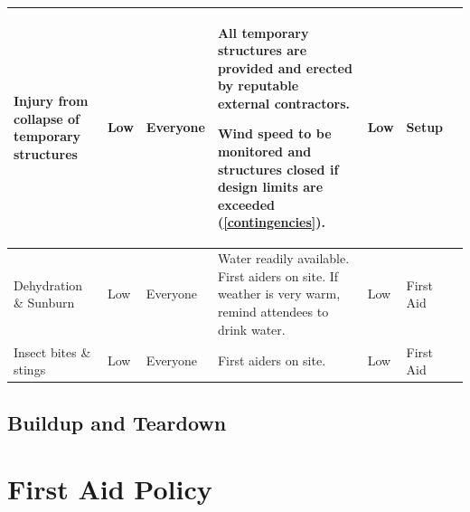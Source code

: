 \begin{landscape}
\begin{table}[h!]
\begin{tabular}{| p{3cm} | l | p{1.5cm} | p{9cm} | p{1.5cm} | p{2cm} | p{6cm} |}
Injury from collapse of temporary structures & Low & Everyone &
All temporary structures are provided and erected by reputable external contractors.

Wind speed to be monitored and structures closed if design limits are exceeded (\cref{contingencies}). &
Low & Setup & \\ \hline

Dehydration \& Sunburn & Low & Everyone &
Water readily available. First aiders on site. If weather is very warm, remind attendees to drink water.
& Low & First Aid & \\ \hline

Insect bites \& stings & Low & Everyone &
First aiders on site. & Low & First Aid & \\ \hline

\end{tabular}
\end{table}
\newpage
\thispagestyle{empty}
\subsection{Buildup and Teardown}


\end{landscape}
\restoregeometry

\appendix

\section{First Aid Policy}
\label{first-aid-policy}

\newpage

